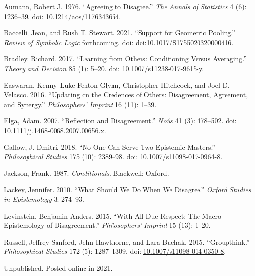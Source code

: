 \documentclass[
  11pt,
  letterpaper,
  DIV=11,
  numbers=noendperiod,
  twoside]{scrartcl}
\newlength{\cslhangindent}
\newenvironment{CSLReferences}[2] %
 {\begin{list}{}{%
  \setlength{\itemindent}{0pt}
  \setlength{\leftmargin}{0pt}
  \setlength{\parsep}{0pt}
  \ifodd #1
   \setlength{\leftmargin}{\cslhangindent}
   \setlength{\itemindent}{-1\cslhangindent}
  \fi
  \setlength{\itemsep}{#2\baselineskip}}}
 {\end{list}}
\begin{document}
\label{refs}
\begin{CSLReferences}{1}{0}
Aumann, Robert J. 1976. {``Agreeing to Disagree.''} \emph{The Annals of
Statistics} 4 (6): 1236--39. doi:
\href{https://doi.org/10.1214/aos/1176343654}{10.1214/aos/1176343654}.

Baccelli, Jean, and Rush T. Stewart. 2021. {``Support for Geometric
Pooling.''} \emph{Review of Symbolic Logic} forthcoming. doi:
\href{https://doi.org/doi:10.1017/S1755020320000416}{doi:10.1017/S1755020320000416}.

Bradley, Richard. 2017. {``Learning from Others: Conditioning Versus
Averaging.''} \emph{Theory and Decision} 85 (1): 5--20. doi:
\href{https://doi.org/10.1007/s11238-017-9615-y}{10.1007/s11238-017-9615-y}.

Easwaran, Kenny, Luke Fenton-Glynn, Christopher Hitchcock, and Joel D.
Velasco. 2016. {``Updating on the Credences of Others: Disagreement,
Agreement, and Synergy.''} \emph{Philosophers' Imprint} 16 (11): 1--39.

Elga, Adam. 2007. {``Reflection and Disagreement.''} \emph{No{û}s} 41
(3): 478--502. doi:
\href{https://doi.org/10.1111/j.1468-0068.2007.00656.x}{10.1111/j.1468-0068.2007.00656.x}.

Gallow, J. Dmitri. 2018. {``No One Can Serve Two Epistemic Masters.''}
\emph{Philosophical Studies} 175 (10): 2389--98. doi:
\href{https://doi.org/10.1007/s11098-017-0964-8}{10.1007/s11098-017-0964-8}.

Jackson, Frank. 1987. \emph{Conditionals}. Blackwell: Oxford.

Lackey, Jennifer. 2010. {``What Should We Do When We Disagree.''}
\emph{Oxford Studies in Epistemology} 3: 274--93.

Levinstein, Benjamin Anders. 2015. {``With All Due Respect: The
Macro-Epistemology of Disagreement.''} \emph{Philosophers' Imprint} 15
(13): 1--20.

Russell, Jeffrey Sanford, John Hawthorne, and Lara Buchak. 2015.
{``Groupthink.''} \emph{Philosophical Studies} 172 (5): 1287--1309. doi:
\href{https://doi.org/10.1007/s11098-014-0350-8}{10.1007/s11098-014-0350-8}.

\end{CSLReferences}



\noindent Unpublished. Posted online in 2021.
\end{document}
